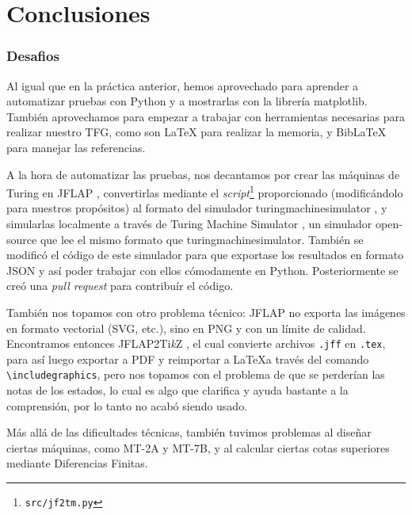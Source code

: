 \part{Conclusiones}

\section{Desafios}
Al igual que en la práctica anterior, hemos aprovechado para aprender a automatizar pruebas con Python y a mostrarlas con la librería matplotlib\supercite{matplotlib}. También aprovechamos para empezar a trabajar con herramientas necesarias para realizar nuestro TFG, como son \LaTeX \supercite{latex} para realizar la memoria, y BibLaTeX \supercite{biblatex} para manejar las referencias.\medskip

A la hora de automatizar las pruebas, nos decantamos por crear las máquinas de Turing en JFLAP \supercite{jflap}, convertirlas mediante el \textit{script}\footnote{\texttt{src/jf2tm.py}} proporcionado (modificándolo para nuestros propósitos) al formato del simulador turingmachinesimulator \supercite{turingmachinesimulator}, y simularlas localmente a través de Turing Machine Simulator \supercite{tmsimulator}, un simulador open-source que lee el mismo formato que turingmachinesimulator. También se modificó el código de este simulador para que exportase los resultados en formato JSON y así poder trabajar con ellos cómodamente en Python. Posteriormente se creó una \textit{pull request} para contribuír el código.\medskip

También nos topamos con otro problema técnico: JFLAP \supercite{jflap} no exporta las imágenes en formato vectorial (SVG, etc.), sino en PNG y con un límite de calidad.\\
Encontramos entonces JFLAP2Ti\textit{k}Z \supercite{jflap2tikz}, el cual convierte archivos \texttt{.jff} en \texttt{.tex}, para así luego exportar a PDF y reimportar a \LaTeX a través del comando \verb|\includegraphics|, pero nos topamos con el problema de que se perderían las notas de los estados, lo cual es algo que clarifica y ayuda bastante a la comprensión, por lo tanto no acabó siendo usado.\medbreak

Más allá de las dificultades técnicas, también tuvimos problemas al diseñar ciertas máquinas, como MT-2A y MT-7B, y al calcular ciertas cotas superiores mediante Diferencias Finitas.

\newpage

